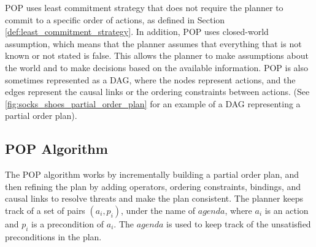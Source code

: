 \ac{POP} uses least commitment strategy that does not require the planner to commit to a specific order of actions, as defined in Section \ref{def:least_commitment_strategy}. In addition, \ac{POP} uses closed-world assumption, which means that the planner assumes that everything that is not known or not stated is false. This allows the planner to make assumptions about the world and to make decisions based on the available information.
\ac{POP} is also sometimes represented as a \acf{DAG}, where the nodes represent actions, and the edges represent the causal links or the ordering constraints between actions. (See \autoref{fig:socks_shoes_partial_order_plan} for an example of a \ac{DAG} representing a partial order plan).

\subsection{POP Algorithm} \label{subsec:pop_algorithm}
The \acf{POP} algorithm works by incrementally building a partial order plan, and then refining the plan by adding operators, ordering constraints,
bindings, and causal links to resolve threats and make the plan consistent.
The planner keeps track of a set of pairs $(a_i, p_i)$, under the name of $agenda$, where $a_i$ is an action and $p_i$ is a precondition of $a_i$. The $agenda$ is used to keep track of the unsatisfied preconditions in the plan.


